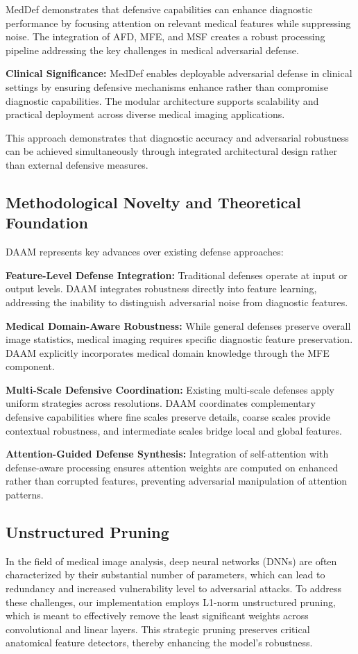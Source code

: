 \documentclass[preprint,12pt]{elsarticle}
\begin{document}
MedDef demonstrates that defensive capabilities can enhance diagnostic performance by focusing attention on relevant medical features while suppressing noise. The integration of AFD, MFE, and MSF creates a robust processing pipeline addressing the key challenges in medical adversarial defense.

\textbf{Clinical Significance:} MedDef enables deployable adversarial defense in clinical settings by ensuring defensive mechanisms enhance rather than compromise diagnostic capabilities. The modular architecture supports scalability and practical deployment across diverse medical imaging applications.

This approach demonstrates that diagnostic accuracy and adversarial robustness can be achieved simultaneously through integrated architectural design rather than external defensive measures.

\subsection{Methodological Novelty and Theoretical Foundation}
\label{sec:novelty}

DAAM represents key advances over existing defense approaches:

\textbf{Feature-Level Defense Integration:} Traditional defenses operate at input or output levels. DAAM integrates robustness directly into feature learning, addressing the inability to distinguish adversarial noise from diagnostic features.

\textbf{Medical Domain-Aware Robustness:} While general defenses preserve overall image statistics, medical imaging requires specific diagnostic feature preservation. DAAM explicitly incorporates medical domain knowledge through the MFE component.

\textbf{Multi-Scale Defensive Coordination:} Existing multi-scale defenses apply uniform strategies across resolutions. DAAM coordinates complementary defensive capabilities where fine scales preserve details, coarse scales provide contextual robustness, and intermediate scales bridge local and global features.

\textbf{Attention-Guided Defense Synthesis:} Integration of self-attention with defense-aware processing ensures attention weights are computed on enhanced rather than corrupted features, preventing adversarial manipulation of attention patterns.

\subsection{Unstructured Pruning}
In the field of medical image analysis, deep neural networks (DNNs) are often characterized by their substantial number of parameters, which can lead to redundancy and increased vulnerability level to adversarial attacks. To address these challenges, our implementation employs L1-norm unstructured pruning, which is meant to effectively remove the least significant weights across convolutional and linear layers. This strategic pruning preserves critical anatomical feature detectors, thereby enhancing the model's robustness.
\end{document}
